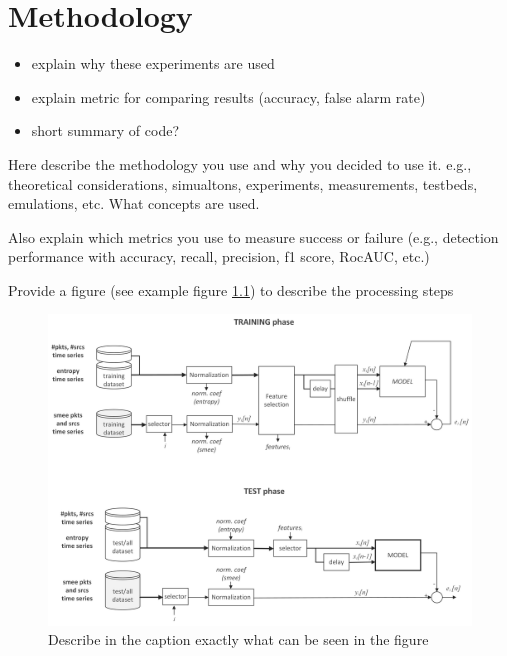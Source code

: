 \chapter{Methodology} \label{sec:methodology}

\begin{itemize}
	\item explain why these experiments are used
	\item explain metric for comparing results (accuracy, false alarm rate)
	\item short summary of code?
\end{itemize}

Here describe the methodology you use and why you decided to use it.
e.g., theoretical considerations, simualtons, experiments, measurements, testbeds, emulations, etc. What concepts are used.

Also explain which metrics you use to measure success or failure (e.g., detection performance with accuracy, recall, precision, f1 score, RocAUC, etc.)


Provide a figure (see example figure \ref{fig:modeling-example}) to describe the processing steps

\begin{figure}[h]
	\centering
	\includegraphics[width=0.95\linewidth]{graphics/modeling-example}
	\caption{Describe in the caption exactly what can be seen in the figure}
	\label{fig:modeling-example}
\end{figure}




\newpage